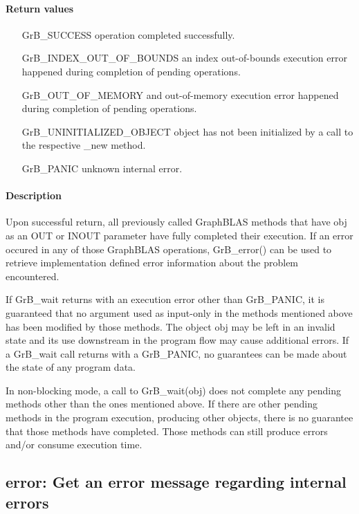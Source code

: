 \paragraph{Return values}
\begin{itemize}[leftmargin=2.3in]
	\item[{\sf GrB\_SUCCESS}]			operation completed successfully.
	\item[{\sf GrB\_INDEX\_OUT\_OF\_BOUNDS}]	an index out-of-bounds execution error happened during completion of pending operations.
	\item[{\sf GrB\_OUT\_OF\_MEMORY}]		and out-of-memory execution error happened during completion of pending operations.
	\item[{\sf GrB\_UNINITIALIZED\_OBJECT}]		object has not been initialized by a call to the respective {\sf *\_new} method.
	\item[{\sf GrB\_PANIC}]				unknown internal error.
\end{itemize}

\paragraph{Description}

Upon successful return, all previously called GraphBLAS methods that
have {\sf obj} as an {\sf OUT} or {\sf INOUT} parameter have fully
completed their execution.
If an
error occured in any of those GraphBLAS operations, {\sf GrB\_error()}
can be used to retrieve implementation defined error information about
the problem encountered.

If {\sf GrB\_wait} returns with an execution error other than {\sf
GrB\_PANIC}, it is guaranteed that no argument used as input-only in the
methods mentioned above has been modified by those methods. The object
{\sf obj} may be left in an invalid state and its use downstream in
the program flow may cause additional errors. If a {\sf GrB\_wait}
call returns with a {\sf GrB\_PANIC}, no guarantees can be made about
the state of any program data.

In non-blocking mode, a call to {\sf GrB\_wait(obj)} does not complete
any pending methods other than the ones mentioned above.
If there are other pending methods
in the program execution, producing other objects, there is no guarantee that
those methods have completed. Those methods can still produce errors
and/or consume execution time.

\subsection{{\sf error}: Get an error message regarding internal errors}

